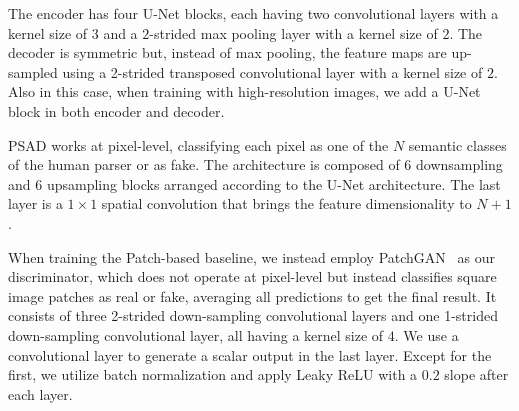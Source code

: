  The encoder has four U-Net blocks, each having two convolutional layers with a kernel size of $3$ and a $2$-strided max pooling layer with a kernel size of $2$. The decoder is symmetric but, instead of max pooling, the feature maps are up-sampled using a 2-strided transposed convolutional layer with a kernel size of $2$. Also in this case, when training with high-resolution images, we add a U-Net block in both encoder and decoder.

 PSAD works at pixel-level, classifying each pixel as one of the $N$ semantic classes of the human parser or as fake. The architecture is composed of $6$ downsampling and $6$ upsampling blocks arranged according to the U-Net architecture. The last layer is a $1\times1$ spatial convolution that brings the feature dimensionality to $N+1$. 

When training the Patch-based baseline, we instead employ PatchGAN~\cite{isola2017image} as our discriminator, which does not operate at pixel-level but instead classifies square image patches as real or fake, averaging all predictions to get the final result. It consists of three 2-strided down-sampling convolutional layers and one 1-strided down-sampling convolutional layer, all having a kernel size of $4$. We use a convolutional layer to generate a scalar output in the last layer. Except for the first, we utilize batch normalization and apply Leaky ReLU with a $0.2$ slope after each layer.

